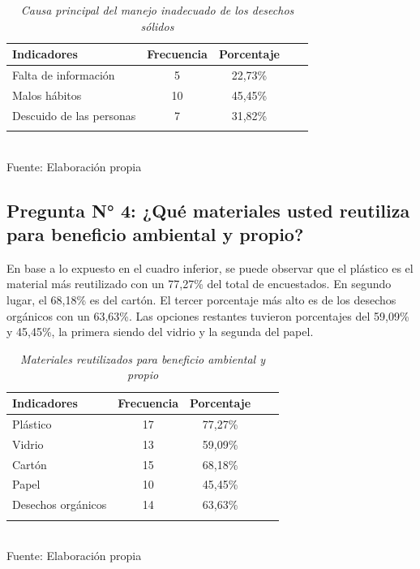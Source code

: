 \setlength{\parindent}{7ex}
\begin{table}[h!]
    \centering
    \captionsetup{singlelinecheck=false, justification=raggedright, labelsep=newline}
    \caption{\textit{Causa principal del manejo inadecuado de los desechos sólidos}}
    \begin{tabular}{lcccc}
        \toprule
        Indicadores & Frecuencia & Porcentaje\\
        \midrule
        Falta de información & 5 & 22,73\% \\
        Malos hábitos & 10 & 45,45\%\\
        Descuido de las personas & 7 & 31,82\% \\
        \bottomrule\\
    \end{tabular}
    \\\RaggedRight Fuente: Elaboración propia
    \label{table:cuadro3}
\end{table}

{\setlength{\parskip}{0cm}
\subsection{Pregunta N° 4: ¿Qué materiales usted reutiliza para beneficio ambiental y propio?}

En base a lo expuesto en el cuadro inferior, se puede observar que el plástico es el material más reutilizado con un 77,27\% del total de encuestados. En segundo lugar, el 68,18\% es del cartón. El tercer porcentaje más alto es de los desechos orgánicos con un 63,63\%. Las opciones restantes tuvieron porcentajes del 59,09\% y 45,45\%, la primera siendo del vidrio y la segunda del papel.

\begin{table}[h!]
    \centering
    \captionsetup{singlelinecheck=false, justification=raggedright, labelsep=newline}
    \caption{\textit{Materiales reutilizados para beneficio ambiental y propio}}
    \begin{tabular}{lcccc}
        \toprule
        Indicadores & Frecuencia & Porcentaje\\
        \midrule
        Plástico & 17 & 77,27\% \\
        Vidrio & 13 & 59,09\%\\
        Cartón & 15 & 68,18\% \\
        Papel & 10 & 45,45\% \\
        Desechos orgánicos & 14 & 63,63\% \\
        \bottomrule
        \\
    \end{tabular}
    \\\RaggedRight Fuente: Elaboración propia
    \label{table:cuadro4}
\end{table}
}

